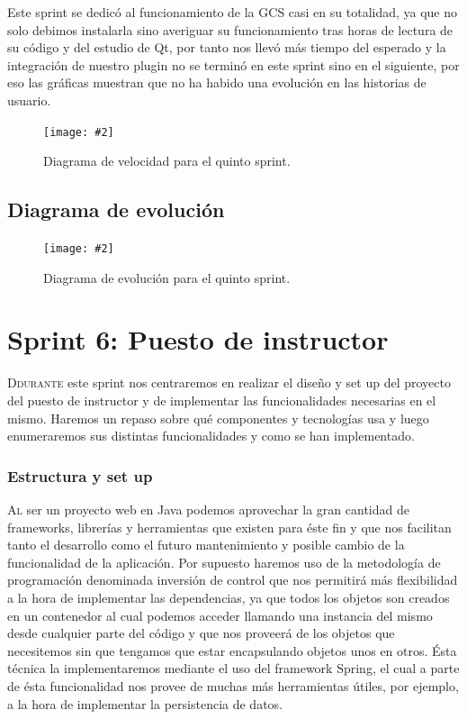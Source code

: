 \documentclass[12pt,a4paper,spanish]{book} %
\newcommand{\imgCentradaGrande}[3]{
\begin{figure}[H]
\begin{center}
\texttt{[image: \#2]}
\caption{#3}
\label{#1}
\end{center}
\end{figure}
}
\begin{document}
Este sprint se dedicó al funcionamiento de la GCS casi en su totalidad, ya que no solo debimos instalarla sino averiguar su funcionamiento tras horas de lectura de su código y del estudio de Qt, por tanto nos llevó más tiempo del esperado y la integración de nuestro plugin no se terminó en este sprint sino en el siguiente, por eso las gráficas muestran que no ha habido una evolución en las historias de usuario.

\imgCentradaGrande{fig.4.17}{img/diagvelocidad5.eps}{Diagrama de velocidad para el quinto sprint.}

\subsection{Diagrama de evolución}
\imgCentradaGrande{fig.4.18}{img/diagevolucion5.eps}{Diagrama de evolución para el quinto sprint.}

\newpage
\section{Sprint 6: Puesto de instructor}

\lettrine{D}{durante} este sprint nos centraremos en realizar el diseño y set up del proyecto del puesto de instructor y de implementar las funcionalidades necesarias en el mismo. Haremos un repaso sobre qué componentes y tecnologías usa y luego enumeraremos sus distintas funcionalidades y como se han implementado.

\subsubsection{Estructura y set up}

\lettrine{A}{l} ser un proyecto web en Java podemos aprovechar la gran cantidad de frameworks, librerías y herramientas que existen para éste fin y que nos facilitan tanto el desarrollo como el futuro mantenimiento y posible cambio de la funcionalidad de la aplicación. Por supuesto haremos uso de la metodología de programación denominada inversión de control que nos permitirá más flexibilidad a la hora de implementar las dependencias, ya que todos los objetos son creados en un contenedor al cual podemos acceder llamando una instancia del mismo desde cualquier parte del código y que nos proveerá de los objetos que necesitemos sin que tengamos que estar encapsulando objetos unos en otros. Ésta técnica la implementaremos mediante el uso del framework Spring, el cual a parte de ésta funcionalidad nos provee de muchas más herramientas útiles, por ejemplo, a la hora de implementar la persistencia de datos.
\end{document}
